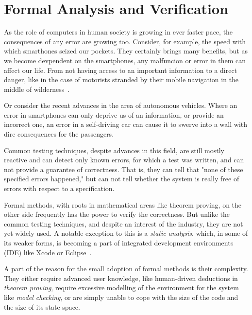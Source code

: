 
\chapter{Formal Analysis and Verification} \label{chap:fav}
As the role of computers in human society is growing in ever faster pace, the consequences of any error are growing too. Consider, for example, the speed with which smarthones seized our pockets. They certainly brings many benefits, but as we become devpendent on the smartphones, any malfuncion or error in them can affect our life. From not having access to an important information to a direct danger, like in the case of motorists stranded by their mobile navigation in the middle of wilderness~\cite{appleMaps}.

Or consider the recent advances in the area of autonomous vehicles. Where an error in smartphones can only deprive us of an information, or provide an incorrect one, an error in a self-driving car can cause it to swerve into a wall with dire consequences for the passengers.

Common testing techniques, despite advances in this field, are still mostly reactive and can detect only known errors, for which a test was written, and can not provide a guarantee of correctness. That is, they can tell that "none of these specified errors happened," but can not tell whether the system is really free of errors with respect to a specification.

Formal methods, with roots in mathematical areas like theorem proving, on the other side frequently has the power to verify the correctness. But unlike the common testing techniques, and despite an interest of the industry, they are not yet widely used. A notable exception to this is a {\em static analysis}, which, in some of its weaker forms, is becoming a part of integrated development environments (IDE) like Xcode or Eclipse~\cite{xcodeAnalysis}.

A part of the reason for the small adoption of formal methods is their complexity. They either require advanced user knowledge, like human-driven deductions in {\em theorem proving}, require excessive modelling of the environment for the system like {\em model checking}, or are simply unable to cope with the size of the code and the size of its state space.

